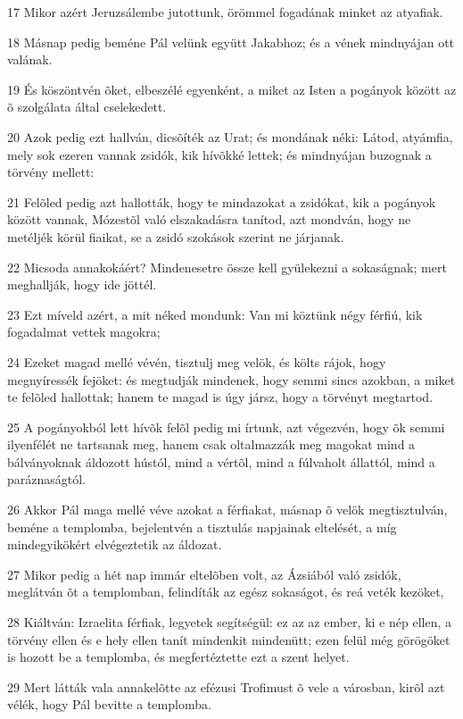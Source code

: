 \par 17 Mikor azért Jeruzsálembe jutottunk, örömmel fogadának minket az atyafiak.
\par 18 Másnap pedig beméne Pál velünk együtt Jakabhoz; és a vének mindnyájan ott valának.
\par 19 És köszöntvén õket, elbeszélé egyenként, a miket az Isten a pogányok között az õ szolgálata által cselekedett.
\par 20 Azok pedig ezt hallván, dicsõíték az Urat; és mondának néki: Látod, atyámfia, mely sok ezeren vannak zsidók, kik hívõkké lettek; és mindnyájan buzognak a törvény mellett:
\par 21 Felõled pedig azt hallották, hogy te mindazokat a zsidókat, kik a pogányok között vannak, Mózestõl való elszakadásra tanítod, azt mondván, hogy ne metéljék körül fiaikat, se a zsidó szokások szerint ne járjanak.
\par 22 Micsoda annakokáért? Mindenesetre össze kell gyülekezni a sokaságnak; mert meghallják, hogy ide jöttél.
\par 23 Ezt míveld azért, a mit néked mondunk: Van mi köztünk négy férfiú, kik fogadalmat vettek magokra;
\par 24 Ezeket magad mellé vévén, tisztulj meg velök, és költs rájok, hogy megnyíressék fejöket: és megtudják mindenek, hogy semmi sincs azokban, a miket te felõled hallottak; hanem te magad is úgy jársz, hogy a törvényt megtartod.
\par 25 A pogányokból lett hívõk felõl pedig mi írtunk, azt végezvén, hogy õk semmi ilyenfélét ne tartsanak meg, hanem csak oltalmazzák meg magokat mind a bálványoknak áldozott hústól, mind a vértõl, mind a fúlvaholt állattól, mind a paráznaságtól.
\par 26 Akkor Pál maga mellé véve azokat a férfiakat, másnap õ velök megtisztulván, beméne a templomba, bejelentvén a tisztulás napjainak eltelését, a míg mindegyikökért elvégeztetik az áldozat.
\par 27 Mikor pedig a hét nap immár eltelõben volt, az Ázsiából való zsidók, meglátván õt a templomban, felindíták az egész sokaságot, és reá veték kezöket,
\par 28 Kiáltván: Izraelita férfiak, legyetek segítségül: ez az az ember, ki e nép ellen, a törvény ellen és e hely ellen tanít mindenkit mindenütt; ezen felül még görögöket is hozott be a templomba, és megfertéztette ezt a szent helyet.
\par 29 Mert látták vala annakelõtte az efézusi Trofimust õ vele a városban, kirõl azt vélék, hogy Pál bevitte a templomba.
